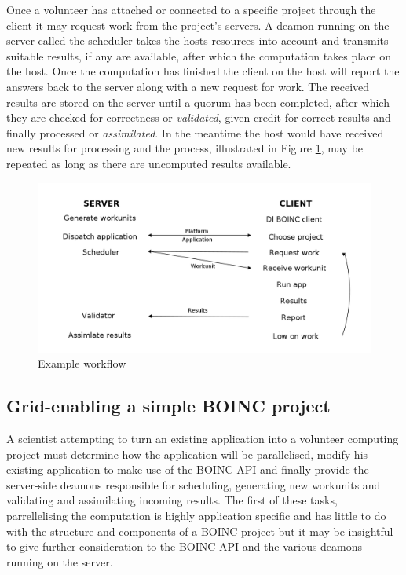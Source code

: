 Once a volunteer has attached or connected to a specific project through the client it may request work from the project's servers. 
A deamon running on the server called the scheduler takes the hosts resources into account and transmits suitable results, if any are available, after which the computation takes place on the host. 
Once the computation has finished the client on the host will  report the answers back to the server along with a new request for work. 
The received results are stored on the server until a quorum has been completed, after which they are checked for correctness or \emph{validated}, given credit for correct results and finally processed or \emph{assimilated}. 
In the meantime the host would have received new results for processing and the process, illustrated in Figure \ref{fig:workflow}, may be repeated as long as there are uncomputed results available.
\begin{figure}[htb]\label{fig:workflow}
\centering

\includegraphics[width=14cm]{images/workflow}

\caption{Example workflow}
\end{figure}

\subsection{Grid-enabling a simple BOINC project}
A scientist attempting to turn an existing application into a volunteer computing project must  determine how the application will be parallelised, modify his existing application to make use of the BOINC API and finally provide the server-side deamons responsible for scheduling,  generating new workunits and validating and assimilating incoming results.
The first of these tasks, parrellelising the computation is highly application specific and has little to do with the structure and components of a BOINC project but it may be insightful to give further consideration to the BOINC API and the various deamons running on the server.
